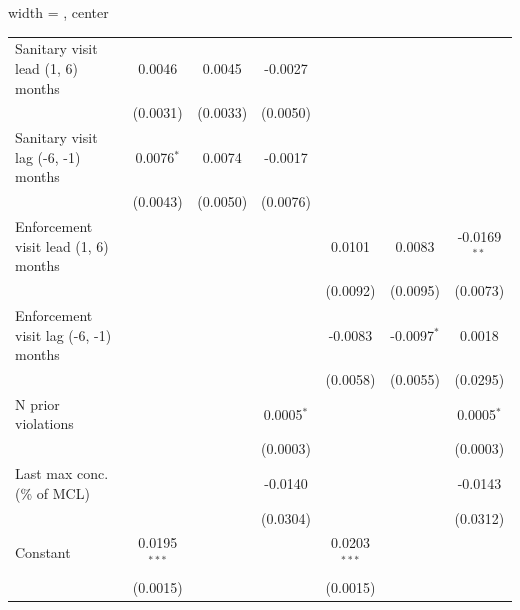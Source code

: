 \begin{table}[htbp]
\begin{adjustbox}{width = \textwidth, center}
\begin{tabular}{lcccccc}
         \midrule 
         Sanitary visit lead (1, 6) months     & 0.0046         & 0.0045        & -0.0027       &                &               &   \\   
                                               & (0.0031)       & (0.0033)      & (0.0050)      &                &               &   \\   
         Sanitary visit lag (-6, -1) months    & 0.0076$^{*}$   & 0.0074        & -0.0017       &                &               &   \\   
                                               & (0.0043)       & (0.0050)      & (0.0076)      &                &               &   \\   
         Enforcement visit lead (1, 6) months  &                &               &               & 0.0101         & 0.0083        & -0.0169$^{**}$\\   
                                               &                &               &               & (0.0092)       & (0.0095)      & (0.0073)\\   
         Enforcement visit lag (-6, -1) months &                &               &               & -0.0083        & -0.0097$^{*}$ & 0.0018\\   
                                               &                &               &               & (0.0058)       & (0.0055)      & (0.0295)\\   
         N prior violations                    &                &               & 0.0005$^{*}$  &                &               & 0.0005$^{*}$\\   
                                               &                &               & (0.0003)      &                &               & (0.0003)\\   
         Last max conc. (\% of MCL)            &                &               & -0.0140       &                &               & -0.0143\\   
                                               &                &               & (0.0304)      &                &               & (0.0312)\\   
         Constant                              & 0.0195$^{***}$ &               &               & 0.0203$^{***}$ &               &   \\   
                                               & (0.0015)       &               &               & (0.0015)       &               &   \\   
         

\end{tabular}
\end{adjustbox}
\end{table}
